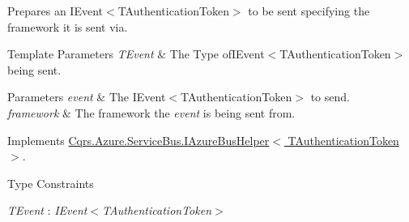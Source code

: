 Prepares an I\+Event$<$\+T\+Authentication\+Token$>$ to be sent specifying the framework it is sent via. 


\begin{DoxyTemplParams}{Template Parameters}
{\em T\+Event} & The Type ofI\+Event$<$\+T\+Authentication\+Token$>$ being sent.\\
\hline
\end{DoxyTemplParams}

\begin{DoxyParams}{Parameters}
{\em event} & The I\+Event$<$\+T\+Authentication\+Token$>$ to send.\\
\hline
{\em framework} & The framework the {\itshape event}  is being sent from.\\
\hline
\end{DoxyParams}


Implements \hyperlink{interfaceCqrs_1_1Azure_1_1ServiceBus_1_1IAzureBusHelper_ab7d1fa5162adc0f01edcf9039bb43c2c_ab7d1fa5162adc0f01edcf9039bb43c2c}{Cqrs.\+Azure.\+Service\+Bus.\+I\+Azure\+Bus\+Helper$<$ T\+Authentication\+Token $>$}.

\begin{Desc}
\item[Type Constraints]\begin{description}
\item[{\em T\+Event} : {\em I\+Event$<$T\+Authentication\+Token$>$}]\end{description}
\end{Desc}
\mbox{\label{classCqrs_1_1Azure_1_1ServiceBus_1_1AzureBusHelper_a89f4ae84aad951fa8f4809f3b23a1893_a89f4ae84aad951fa8f4809f3b23a1893}} 
